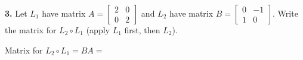 \documentclass[10pt]{article}
\begin{document}
\vspace{0.10in}

\begin{notesbox}
\textbf{3.} Let $L_1$ have matrix $A=\begin{bmatrix}2&0\\0&2\end{bmatrix}$ and
$L_2$ have matrix $B=\begin{bmatrix}0&-1\\1&0\end{bmatrix}$.
Write the matrix for $L_2\circ L_1$ (apply $L_1$ first, then $L_2$).

\vspace{0.06in}

\vspace{0.04in}
Matrix for $L_2\circ L_1 = BA = $ 
\end{notesbox}
\end{document}
